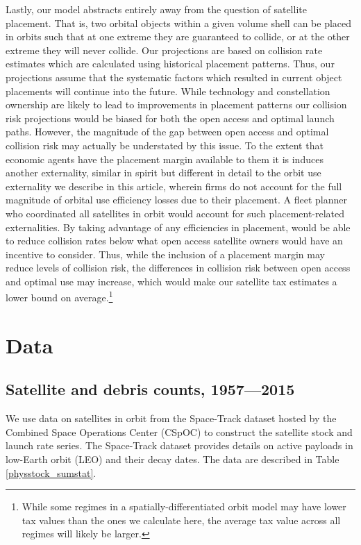 \documentclass[12pt]{article}
\begin{document}
Lastly, our model abstracts entirely away from the question of satellite placement. That is, two orbital objects within a given volume shell can be placed in orbits such that at one extreme they are guaranteed to collide, or at the other extreme they will never collide. Our projections are based on collision rate estimates which are calculated using historical placement patterns. Thus, our projections assume that the systematic factors which resulted in current object placements will continue into the future. While technology and constellation ownership are likely to lead to improvements in placement patterns our collision risk projections would be biased for both the open access and optimal launch paths. However, the magnitude of the gap between open access and optimal collision risk may actually be understated by this issue. To the extent that economic agents have the placement margin available to them it is induces another externality, similar in spirit but different in detail to the orbit use externality we describe in this article, wherein firms do not account for the full magnitude of orbital use efficiency losses due to their placement. A fleet planner who coordinated all satellites in orbit would account for such placement-related externalities. By taking advantage of any efficiencies in placement, would be able to reduce collision rates below what open access satellite owners would have an incentive to consider. Thus, while the inclusion of a placement margin may reduce levels of collision risk, the differences in collision risk between open access and optimal use may increase, which would make our satellite tax estimates a lower bound on average.\footnote{While some regimes in a spatially-differentiated orbit model may have lower tax values than the ones we calculate here, the average tax value across all regimes will likely be larger.}


\section{Data}

\subsection{Satellite and debris counts, 1957---2015}

We use data on satellites in orbit from the Space-Track dataset hosted by the Combined Space Operations Center (CSpOC) \citep{spacetrackData} to construct the satellite stock and launch rate series. The Space-Track dataset provides details on active payloads in low-Earth orbit (LEO) and their decay dates. The data are described in Table \ref{physstock_sumstat}.\\
\end{document}
